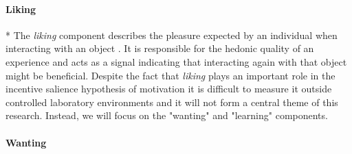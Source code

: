\paragraph{Liking}*
\label{liking}
The \emph{liking} component describes the pleasure expected by an individual when interacting with an object \cite{berridge2009dissecting}. It is responsible for the hedonic quality of an experience and acts as a signal indicating that interacting again with that object might be beneficial. Despite the fact that \emph{liking} plays an important role in the incentive salience hypothesis of motivation it is difficult to measure it outside controlled laboratory environments \cite{berridge1998role} and it will not form a central theme of this research. Instead, we will focus on the "wanting" and "learning" components.

\paragraph{Wanting}
\label{wanting}
